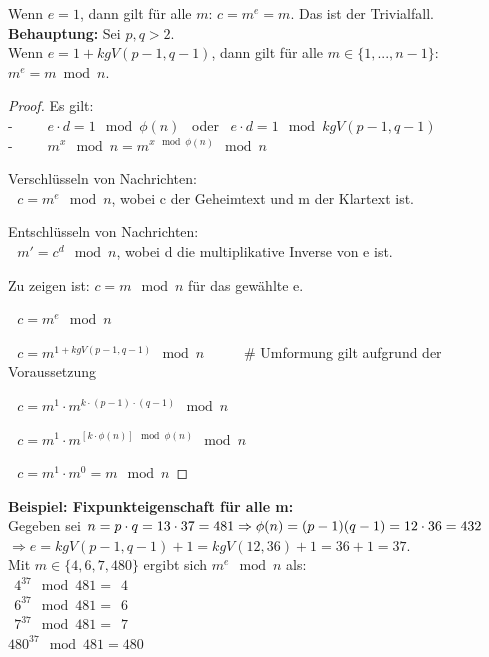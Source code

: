 \begin{refsegment}
 Wenn $e=1$, dann gilt für alle $ m$: $ c = m^e = m$. Das ist der Trivialfall.\\

\textbf{Behauptung:} Sei $p,q > 2$.\\
Wenn $e=1+kgV(p-1,q-1)$, dann gilt für alle $ m \in \{1,...,n-1\}$: $ m^e = m \bmod n$.

\begin{proof}{}
Es gilt:\\
-~~~ $ ~~~ e\cdot d=1 \mod \phi(n)$ ~oder~ $e\cdot d=1 \mod kgV(p-1,q-1) $\\
-~~~ $ ~~~ m^{x} \mod n = m^{x \mod \phi(n)} \mod n $

 Verschlüsseln von Nachrichten:\\
 $~~~c=m^e \mod n$, wobei c der Geheimtext und m der Klartext ist.

 Entschlüsseln von Nachrichten:\\
 $~~~m'=c^d \mod n$, wobei d die multiplikative Inverse von e ist.

 Zu zeigen ist: $c=m \mod n$ für das gewählte e.

$~~~c = m^e \mod n$

$~~~c = m^{1+kgV(p-1,q-1)} \mod n$  ~~~~~\# Umformung gilt aufgrund der Voraussetzung

$~~~c = m^1 \cdot m^{k \cdot (p-1) \cdot (q-1)} \mod n$

$~~~c = m^1 \cdot m^{[k \cdot \phi(n)] \mod \phi(n)} \mod n$

$~~~c = m^1 \cdot m^{0} = m \mod n $
\end{proof}

\textbf{Beispiel: Fixpunkteigenschaft für alle m:}\\
Gegeben sei $n=p\cdot q= 13\cdot 37=481\\
\Rightarrow \phi(n)=(p-1)(q-1)=12\cdot 36=432$\\
$\Rightarrow e=kgV(p-1,q-1)+1=kgV(12,36)+1=36+1=37$.\\
Mit $m \in \{4,6,7,480\}$ ergibt sich $m^{e} \mod n$ als:\\
$~~4^{37} \mod 481=~~4 $\\
$~~6^{37} \mod 481=~~6 $\\
$~~7^{37} \mod 481=~~7 $\\
$480^{37} \mod 481=480 $\\


\end{refsegment}
